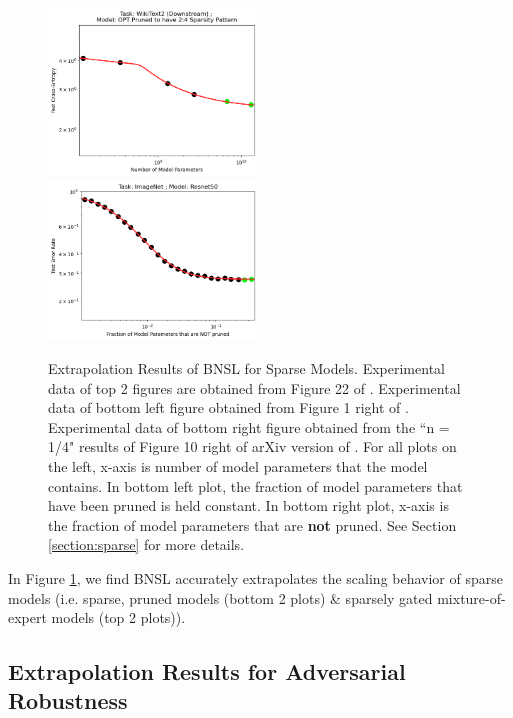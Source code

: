 \documentclass{article} %
\begin{document}
\begin{figure}[htbp]
\includegraphics[width=0.496\textwidth]{figures/sparse/sparsity_via_pruning.png}
\includegraphics[width=0.496\textwidth]{figures/sparse/pruning_on_x-axis.png}
\vspace{-8.5mm}
    \caption{
Extrapolation Results of BNSL for Sparse Models. Experimental data of top 2 figures are obtained from Figure 22 of \cite{clark2022unified}. Experimental data of bottom left figure obtained from Figure 1 right of \cite{frantar2023massive}. Experimental data of bottom right figure obtained from the ``n = 1/4" results of Figure 10 right of arXiv version of \cite{rosenfeld2021predictability}. For all plots on the left, x-axis is number of model parameters that the model contains. In bottom left plot, the fraction of model parameters that have been pruned is held constant. In bottom right plot, x-axis is the fraction of model parameters that are \textbf{not} pruned. See Section \ref{section:sparse} for more details.
    }
    \label{fig:sparse}
\end{figure}

\vspace{-2.5mm}

In Figure \ref{fig:sparse}, we find BNSL accurately extrapolates the scaling behavior of sparse models (i.e. sparse, pruned models (bottom 2 plots) \& sparsely gated mixture-of-expert models (top 2 plots)).

\subsection{Extrapolation Results for Adversarial Robustness}
\label{section:adversarial_robustness}
\end{document}
